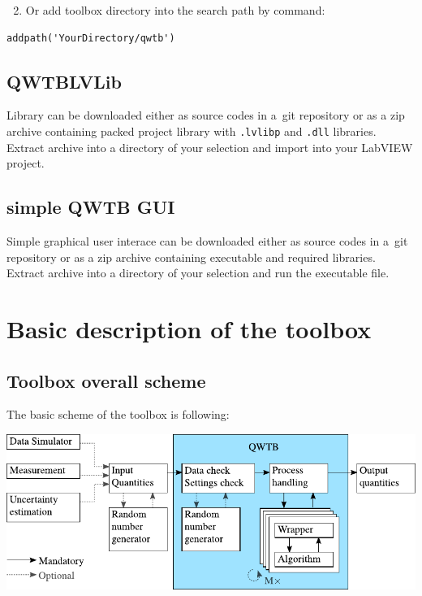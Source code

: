 \documentclass[12pt,a4paper,oneside]{report} %
\def\labview{{\sc LabVIEW}\xspace}
\begin{document}
\begin{enumerate}
        \setcounter{enumi}{1}
        \item Or add toolbox directory into the search path by command:
\end{enumerate}
\begin{lstlisting}
addpath('YourDirectory/qwtb')
\end{lstlisting}

\section{QWTBLVLib} %
Library can be downloaded either as source codes in a~{\sc git} repository or as a zip archive
containing packed project library with {\tt .lvlibp} and {\tt .dll} libraries. Extract archive into
a directory of your selection and import into your \labview project. 

\section{simple QWTB GUI} %
Simple graphical user interace can be downloaded either as source codes in a~{\sc git} repository or
as a zip archive containing executable and required libraries. Extract archive into a directory of
your selection and run the executable file.

\chapter{Basic description of the toolbox} %
\section{Toolbox overall scheme} %
The basic scheme of the toolbox is following:
\begin{center}
        \includegraphics{sources/basic scheme v2.pdf}
\end{center}
\end{document}
